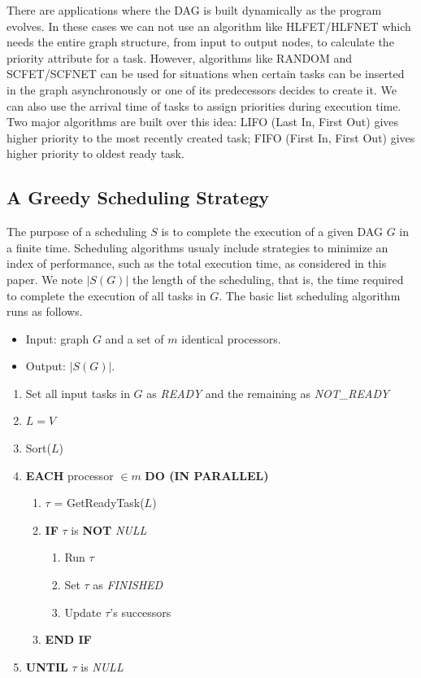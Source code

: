 \documentclass[twocolumn]{svjour3}
\begin{document}
There are applications where the DAG is built dynamically as the program evolves. In these cases we can not use an algorithm like HLFET/HLFNET which needs the entire graph structure, from input to output {\color{blue}nodes}, to calculate the priority attribute for a task. However, algorithms like RANDOM and SCFET/SCFNET can be used for situations when certain tasks can be inserted in the graph asynchronously or one of its predecessors decides to create it. We can also use the arrival time of tasks to assign priorities during execution time. Two major algorithms are built over this idea: LIFO (Last In, First Out) gives higher priority to the most recently created task; FIFO (First In, First Out) gives higher priority to oldest ready task.

\subsection{A Greedy Scheduling Strategy} \label{ss_greedy_strategy}

The purpose of a scheduling $S$ is to complete the execution of a given DAG $G$ in a finite time. Scheduling algorithms usualy include strategies to minimize an index of performance, such as the total execution time, as considered in this paper. We note $|S(G)|$ the length of the scheduling, that is, the time required to complete the execution of all tasks in $G$. The basic list scheduling algorithm runs as follows.

{\small
\begin{itemize}
\item Input: graph $G$ and a set of $m$ identical processors.
\item Output: $|S(G)|$.
\end{itemize}
\begin{enumerate}
\item Set all input tasks in $G$ as \emph{READY} and the remaining as \emph{NOT\_READY}
\item $L = V$
\item Sort($L$)
\item \textbf{EACH} processor $\in m$ \textbf{DO (IN PARALLEL)}
   \begin{enumerate}
		\item $\tau$ = GetReadyTask($L$)
		\item \textbf{IF} $\tau$ is \textbf{NOT} \emph{NULL}
            \begin{enumerate}
              \item Run $\tau$
              \item Set $\tau$ as \emph{FINISHED}
			  \item Update $\tau$'s successors
            \end{enumerate}
		\item \textbf{END IF}
   \end{enumerate}
\item \textbf{UNTIL} $\tau$ is \emph{NULL}
\end{enumerate}
}
\end{document}
